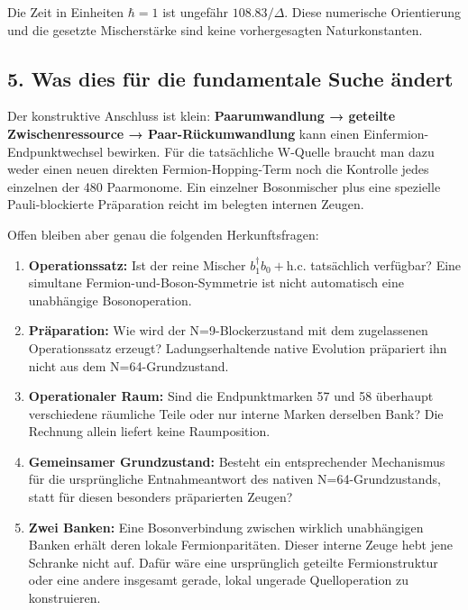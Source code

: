 Die Zeit in Einheiten \(\hbar=1\) ist ungefähr \(108.83/\Delta\). Diese
numerische Orientierung und die gesetzte Mischerstärke sind keine
vorhergesagten Naturkonstanten.

\subsection{5. Was dies für die fundamentale Suche
ändert}\label{was-dies-fuxfcr-die-fundamentale-suche-uxe4ndert}

Der konstruktive Anschluss ist klein: \textbf{Paarumwandlung → geteilte
Zwischenressource → Paar-Rückumwandlung} kann einen
Einfermion-Endpunktwechsel bewirken. Für die tatsächliche W-Quelle
braucht man dazu weder einen neuen direkten Fermion-Hopping-Term noch
die Kontrolle jedes einzelnen der 480 Paarmonome. Ein einzelner
Bosonmischer plus eine spezielle Pauli-blockierte Präparation reicht im
belegten internen Zeugen.

Offen bleiben aber genau die folgenden Herkunftsfragen:

\begin{enumerate}
\def\labelenumi{\arabic{enumi}.}
\tightlist
\item
  \textbf{Operationssatz:} Ist der reine Mischer
  \(b_1^\dagger b_0+\mathrm{h.c.}\) tatsächlich verfügbar? Eine
  simultane Fermion-und-Boson-Symmetrie ist nicht automatisch eine
  unabhängige Bosonoperation.
\item
  \textbf{Präparation:} Wie wird der N=9-Blockerzustand mit dem
  zugelassenen Operationssatz erzeugt? Ladungserhaltende native
  Evolution präpariert ihn nicht aus dem N=64-Grundzustand.
\item
  \textbf{Operationaler Raum:} Sind die Endpunktmarken 57 und 58
  überhaupt verschiedene räumliche Teile oder nur interne Marken
  derselben Bank? Die Rechnung allein liefert keine Raumposition.
\item
  \textbf{Gemeinsamer Grundzustand:} Besteht ein entsprechender
  Mechanismus für die ursprüngliche Entnahmeantwort des nativen
  N=64-Grundzustands, statt für diesen besonders präparierten Zeugen?
\item
  \textbf{Zwei Banken:} Eine Bosonverbindung zwischen wirklich
  unabhängigen Banken erhält deren lokale Fermionparitäten. Dieser
  interne Zeuge hebt jene Schranke nicht auf. Dafür wäre eine
  ursprünglich geteilte Fermionstruktur oder eine andere insgesamt
  gerade, lokal ungerade Quelloperation zu konstruieren.
\end{enumerate}

